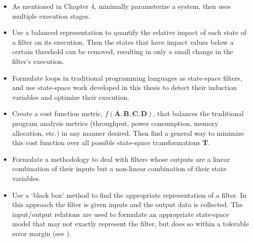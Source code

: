 \begin{itemize}

\item As mentioned in Chapter 4, minimally parameterize a system,
then uses multiple execution stages.

\item Use a balanced representation \cite{Moore} to quantify the
relative impact of each state of a filter on its execution. Then
the states that have impact values below a certain threshold can
be removed, resulting in only a small change in the filter's
execution.

\item Formulate loops in traditional programming languages as
state-space filters, and use state-space work developed in this
thesis to detect their induction variables and optimize their
execution.

\item Create a cost function metric,
$f(\mathbf{A},\mathbf{B},\mathbf{C},\mathbf{D})$, that balances
the traditional program analysis metrics (throughput, power
consumption, memory allocation, etc.) in any manner desired. Then
find a general way to minimize this cost function over all
possible state-space transformations $\mathbf{T}$.

\item Formulate a methodology to deal with filters whose outputs
are a linear combination of their inputs but a non-linear
combination of their state variables.

\item Use a `black box' method to find the appropriate
representation of a filter. In this approach the filter is given
inputs and the output data is collected. The input/output
relations are used to formulate an appropriate state-space model
that may not exactly represent the filter, but does so within a
tolerable error margin (see \cite{Schutter}).
\end{itemize}
